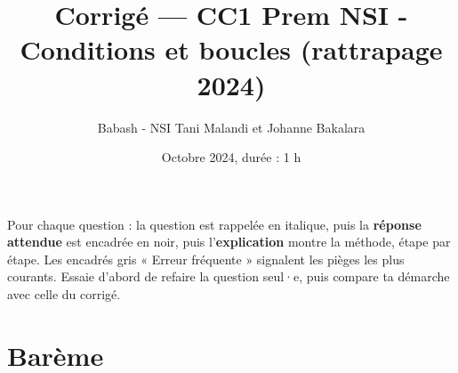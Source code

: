 \documentclass[addpoints, 11pt]{exam}
\title{Corrigé --- CC1 Prem NSI - Conditions et boucles (rattrapage 2024)}
\author{Babash - NSI Tani Malandi et Johanne Bakalara}
\date{Octobre 2024, durée : 1 h}
\DeclareRobustCommand{\_}{\textunderscore\allowbreak}
\begin{document}
\pagestyle{headandfoot}
\firstpageheader{}{}{}

\maketitle
\thispagestyle{headandfoot}

\begin{astuce}
Pour chaque question : la question est rappelée en italique, puis la \textbf{réponse attendue} est encadrée en noir, puis l'\textbf{explication} montre la méthode, étape par étape.
Les encadrés gris « Erreur fréquente » signalent les pièges les plus courants. Essaie d'abord de refaire la question seul·e, puis compare ta démarche avec celle du corrigé.
\end{astuce}

\section*{Barème}
\begin{center}
  \gradetable[h]
\end{center}
\end{document}
